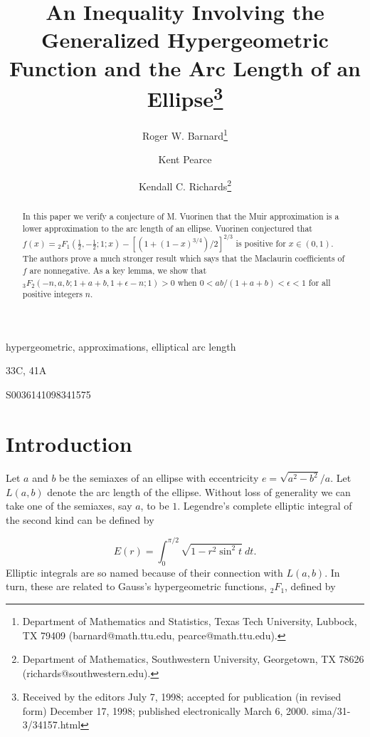 \documentclass[final]{siamltex}
\title{An Inequality Involving the Generalized Hypergeometric Function
and the Arc Length
\newline
of an Ellipse\thanks{Received by the editors July 7, 1998; 
accepted for publication (in revised form) December 17, 1998; published electronically
March 6, 2000. \URL sima/31-3/34157.html}}
\author{Roger W. Barnard\thanks{Department of 
Mathematics and Statistics,  Texas Tech University, 
Lubbock, TX 79409 
(barnard@math.ttu.edu, pearce@math.ttu.edu).}
\and Kent Pearce\footnotemark[2] 
\and Kendall C. Richards\thanks {Department of 
Mathematics, Southwestern University, 
Georgetown, TX  78626 (richards@\allowbreak southwestern.edu).}}
\begin{document}
\maketitle
\vspace{-1.2in}
\vspace{.9in}

\setcounter{page}{693}

\begin{abstract}
In this paper we verify a conjecture of M. Vuorinen that the
Muir approximation is a lower approximation to the arc length of
an ellipse. Vuorinen conjectured that 
$f(x)={}_{2}F_{1}({\frac{1}{2}},-{\frac{1}{2}};1;x)-[(1+(1-x)^{3/4})/2]^{2/3}$ is positive for 
$x\in (0,1)$. The authors prove a much stronger result which says that the Maclaurin coefficients of $f$
are nonnegative. As a key lemma, we show that 
${}_{3}F_{2}(-n,a,b;1+a+b,1+\epsilon -n;1)>0$ when $0<ab/(1+a+b)<\epsilon <1$ for all positive integers 
$n$.
\end{abstract}

\begin{keywords} 
hypergeometric, approximations, elliptical arc length 
\end{keywords}

\begin{AMS}
33C, 41A
\end{AMS}

\begin{PII}
S0036141098341575
\end{PII}

\pagestyle{myheadings}
\thispagestyle{plain}

\section{Introduction}
Let $a$ and $b$ be the semiaxes of an ellipse with eccentricity $e = \sqrt{a^2 - b^2}/a$.  Let
$L(a,b)$ denote the arc length of the ellipse.  Without loss of generality we can take one of the semiaxes, 
say $a$, to be $1$.  Legendre's complete elliptic integral of the second kind can be defined by 

\[
E(r) = \int_{0}^{\pi/2} \sqrt{ 1 - r^2 \sin^2 t}\ dt.
\]
Elliptic integrals are so named because of their connection with $L(a,b)$.  In turn, these are related to 
Gauss's hypergeometric functions, ${}_{2}F_{1}$, defined by
\end{document}
